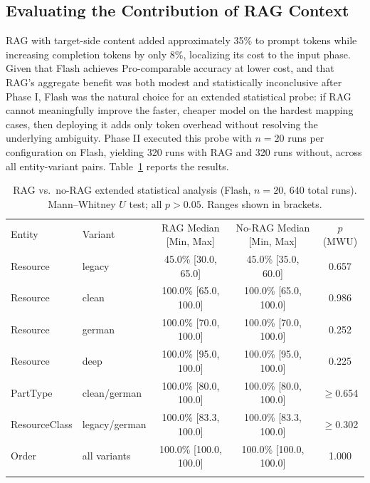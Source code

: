 \documentclass[3p,times,procedia]{elsarticle}
\begin{document}
\subsection{Evaluating the Contribution of RAG Context}
\label{sec:eval-statistical}

RAG with target-side content added approximately 35\% to prompt tokens while increasing completion tokens by only 8\%, localizing its cost to the input phase. Given that Flash achieves Pro-comparable accuracy at lower cost, and that RAG's aggregate benefit was both modest and statistically inconclusive after Phase I, Flash was the natural choice for an extended statistical probe: if RAG cannot meaningfully improve the faster, cheaper model on the hardest mapping cases, then deploying it adds only token overhead without resolving the underlying ambiguity. Phase II executed this probe with $n = 20$ runs per configuration on Flash, yielding 320 runs with RAG and 320 runs without, across all entity-variant pairs. Table~\ref{tab:statistical} reports the results.

\begin{table}[h]
\footnotesize
\caption{RAG vs.\ no-RAG extended statistical analysis (Flash, $n=20$, 640 total runs). Mann--Whitney $U$ test; all $p > 0.05$. Ranges shown in brackets.}
\label{tab:statistical}
\begin{tabular*}{\hsize}{@{\extracolsep{\fill}}llccc@{}}
\toprule
Entity & Variant & RAG Median [Min, Max] & No-RAG Median [Min, Max] & $p$ (MWU) \\
\colrule
Resource      & legacy        & 45.0\% [30.0, 65.0]  & 45.0\% [35.0, 60.0]  & 0.657 \\
Resource      & clean         & 100.0\% [65.0, 100.0] & 100.0\% [65.0, 100.0] & 0.986 \\
Resource      & german        & 100.0\% [70.0, 100.0] & 100.0\% [70.0, 100.0] & 0.252 \\
Resource      & deep          & 100.0\% [95.0, 100.0] & 100.0\% [95.0, 100.0] & 0.225 \\
PartType      & clean/german  & 100.0\% [80.0, 100.0] & 100.0\% [80.0, 100.0] & $\geq$0.654 \\
ResourceClass & legacy/german & 100.0\% [83.3, 100.0] & 100.0\% [83.3, 100.0] & $\geq$0.302 \\
Order         & all variants  & 100.0\% [100.0, 100.0] & 100.0\% [100.0, 100.0] & 1.000 \\
\botrule
\end{tabular*}
\end{table}
\end{document}
